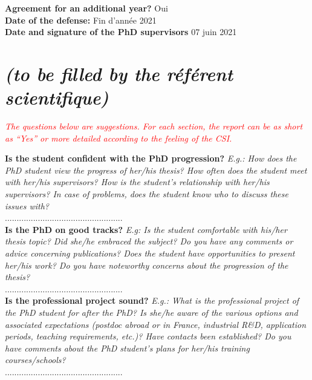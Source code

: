 \documentclass[12pt]{article}
\newcommand{\commentaire}[1]{\small\textit{#1}}
\begin{document}
\noindent\textbf{Agreement for an additional year?}
Oui
\\

\noindent\textbf{Date of the defense:}
Fin d'année 2021
\\


\noindent\textbf{Date and signature of the PhD supervisors}
07 juin 2021

\newpage
\section*{ \textit{\small (to be filled by the ré\-fé\-rent scientifique)}}

\commentaire{%
  \textcolor{red}{The questions below are suggestions. For each
    section, the report can be as short as “Yes” or more detailed
    according to the feeling of the CSI.\\}}

\noindent\textbf{Is the student confident with the PhD progression?}
\commentaire{%
  E.g.: How does the PhD student view the progress of
  her/his thesis? How often does the student meet with her/his
  supervisors? How is the student’s relationship with her/his
  supervisors? In case of problems, does the student know who to
  discuss these issues with?\\}
..................................................
\\

\noindent\textbf{Is the PhD on good tracks?}
\commentaire{%
  E.g: Is the student comfortable with his/her thesis topic? Did
  she/he embraced the subject? Do you have any comments or advice
  concerning publications? Does the student have opportunities to
  present her/his work? Do you have noteworthy concerns about the
  progression of the thesis?\\}
..................................................
\\

\noindent\textbf{Is the professional project sound?}
\commentaire{%
  E.g.: What is the professional project of the PhD student for after
  the PhD? Is she/he aware of the various options and associated
  expectations (postdoc abroad or in France, industrial R\&D,
  application periods, teaching requirements, etc.)? Have contacts
  been established? Do you have comments about the PhD student’s
  plans for her/his training courses/schools?\\}
..................................................
\\
\end{document}
